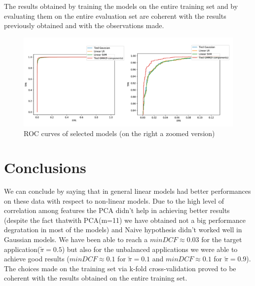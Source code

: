 \documentclass[10pt, a4paper, twocolumn]{article} %
\begin{document}
The results obtained by training the models on the entire training set and by evaluating
them on the entire evaluation set are coherent with the results previously
obtained and with the observations made.
\begin{figure}[ht!]
	\includegraphics[width=\linewidth]{./Pictures/FeaturesAnalysis/roc.png}
	\caption{ROC curves of selected models (on the right a zoomed version)}
	\label{roc} 
\end{figure}
\section{Conclusions}
We can conclude by saying that in general linear models had better performances
on these data with respect to non-linear models. Due to the high level of correlation
among features the PCA didn't help in achieving better results (despite  the fact thatwith PCA(m=11)
we have obtained not a big performance degratation in most of the models) and Naive hypothesis didn't worked
well in Gaussian models. We have been able to reach a $minDCF\approx0.03$ for
the target application($\tilde{\pi}=0.5$) but also for the unbalanced applications
we were able to achieve good results ($minDCF\approx0.1$ for $\tilde{\pi}=0.1$ and 
$minDCF\approx0.1$ for $\tilde{\pi}=0.9$). The choices made on the training set
via k-fold cross-validation proved to be coherent with the results obtained on
the entire training set.

\printbibliography[title={Bibliography}] %

\end{document}
